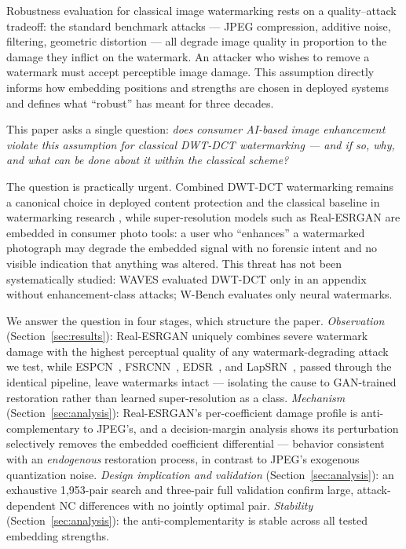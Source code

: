 \documentclass[conference]{IEEEtran}
\begin{document}
Robustness evaluation for classical image watermarking rests on a
quality--attack tradeoff: the standard benchmark attacks --- JPEG
compression, additive noise, filtering, geometric distortion
\cite{petitcolas1998,cox2007} --- all degrade image quality in
proportion to the damage they inflict on the watermark. An attacker
who wishes to remove a watermark must accept perceptible image damage.
This assumption directly informs how embedding positions and strengths
are chosen in deployed systems and defines what ``robust'' has meant
for three decades.

This paper asks a single question: \emph{does consumer AI-based image
enhancement violate this assumption for classical DWT-DCT watermarking
--- and if so, why, and what can be done about it within the classical
scheme?}

The question is practically urgent. Combined DWT-DCT watermarking
\cite{alhaj2007} remains a canonical choice in deployed content
protection and the classical baseline in watermarking research
\cite{waves2024}, while super-resolution models such as Real-ESRGAN
\cite{realesrgan2021} are embedded in consumer photo tools: a user who
``enhances'' a watermarked photograph may degrade the embedded signal
with no forensic intent and no visible indication that anything was
altered. This threat has not been systematically studied: WAVES
\cite{waves2024} evaluated DWT-DCT only in an appendix without
enhancement-class attacks; W-Bench \cite{wbench2024} evaluates only
neural watermarks.

We answer the question in four stages, which structure the paper.
\emph{Observation} (Section~\ref{sec:results}): Real-ESRGAN uniquely
combines severe watermark damage with the highest perceptual quality of
any watermark-degrading attack we test, while ESPCN~\cite{espcn2016},
FSRCNN~\cite{fsrcnn2016}, EDSR~\cite{edsr2017}, and
LapSRN~\cite{lapsrn2017}, passed through
the identical pipeline, leave watermarks intact --- isolating the cause
to GAN-trained restoration rather than learned super-resolution as a
class. \emph{Mechanism} (Section~\ref{sec:analysis}): Real-ESRGAN's
per-coefficient damage profile is anti-complementary to JPEG's, and a
decision-margin analysis shows its perturbation selectively removes the
embedded coefficient differential --- behavior consistent with an
\emph{endogenous} restoration process, in contrast to JPEG's exogenous
quantization noise. \emph{Design implication and validation}
(Section~\ref{sec:analysis}): an exhaustive 1,953-pair search and
three-pair full validation confirm large, attack-dependent NC
differences with no jointly optimal pair. \emph{Stability}
(Section~\ref{sec:analysis}): the anti-complementarity is stable across
all tested embedding strengths.
\end{document}
